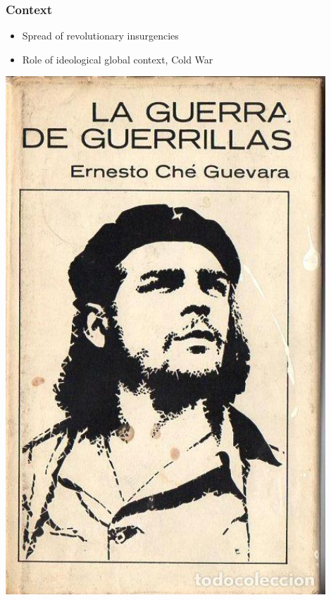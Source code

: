 \documentclass[utf8, xcolor=dvipsnames]{beamer}
\begin{document}
\begin{frame}
\frametitle{Context}
\centering

\begin{minipage}{0.49\textwidth}\centering
\begin{itemize}
  \item Spread of revolutionary insurgencies
  \item Role of ideological global context, Cold War
\end{itemize}
\end{minipage}\hfill
\begin{minipage}{0.49\textwidth}\centering
\includegraphics[width = 0.9\textwidth]{img/guevara}
\end{minipage}

\end{frame}
\end{document}
